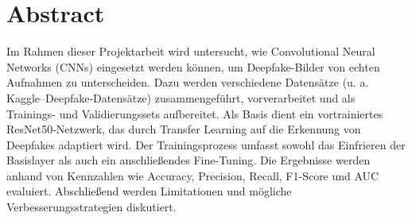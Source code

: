 \chapter*{Abstract}

Im Rahmen dieser Projektarbeit wird untersucht, wie Convolutional Neural Networks (CNNs) eingesetzt werden können, um Deepfake-Bilder von echten Aufnahmen zu unterscheiden. Dazu werden verschiedene Datensätze (u. a. Kaggle–Deepfake‐Datensätze) zusammengeführt, vorverarbeitet und als Trainings- und Validierungssets aufbereitet. Als Basis dient ein vortrainiertes ResNet50‐Netzwerk, das durch Transfer Learning auf die Erkennung von Deepfakes adaptiert wird. Der Trainingsprozess umfasst sowohl das Einfrieren der Basislayer als auch ein anschließendes Fine-Tuning. Die Ergebnisse werden anhand von Kennzahlen wie Accuracy, Precision, Recall, F1-Score und AUC evaluiert. Abschließend werden Limitationen und mögliche Verbesserungsstrategien diskutiert. 
